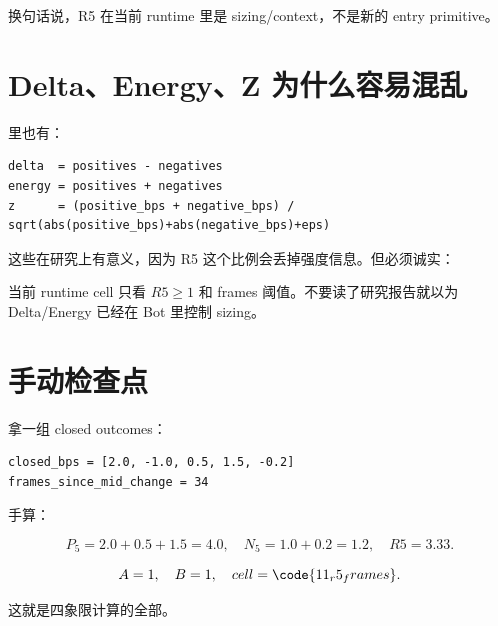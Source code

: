 换句话说，R5 在当前 runtime 里是 sizing/context，不是新的 entry primitive。

\section{Delta、Energy、Z 为什么容易混乱}

 里也有：

\begin{lstlisting}
delta  = positives - negatives
energy = positives + negatives
z      = (positive_bps + negative_bps) / sqrt(abs(positive_bps)+abs(negative_bps)+eps)
\end{lstlisting}

这些在研究上有意义，因为 R5 这个比例会丢掉强度信息。但必须诚实：


当前 runtime cell 只看 \(R5 \ge 1\) 和 frames 阈值。不要读了研究报告就以为 Delta/Energy 已经在 Bot 里控制 sizing。

\section{手动检查点}

拿一组 closed outcomes：

\begin{lstlisting}
closed_bps = [2.0, -1.0, 0.5, 1.5, -0.2]
frames_since_mid_change = 34
\end{lstlisting}

手算：

\[
P_5=2.0+0.5+1.5=4.0,\quad
N_5=1.0+0.2=1.2,\quad
R5=3.33.
\]

\[
A=1,\quad B=1,\quad cell=\code{11_r5_frames}.
\]

这就是四象限计算的全部。

